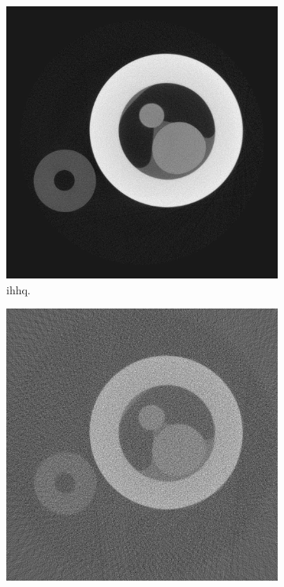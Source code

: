 \begin{figure}
    \begin{subfigure}[t]{.3\textwidth}
      \centering
      \includegraphics[width=\linewidth]{figures/kimrobertgt.png}
      \caption{\gls{ihhq}. }
    \end{subfigure}
    \hfill
    \begin{subfigure}[t]{.3\textwidth}
      \centering
      \includegraphics[width=\linewidth]{figures/kimrobertFDK.png}

\end{subfigure}
\end{figure}
